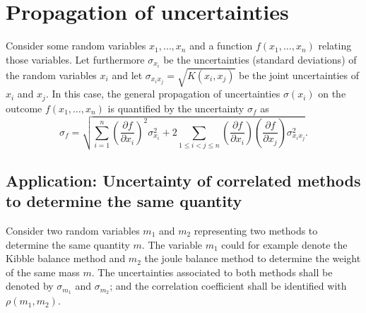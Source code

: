 \documentclass{report}
\numberwithin{tm}{section}
\begin{document}
\section{Propagation of uncertainties}
Consider some random variables $x_1,\dots,x_n$ and a function $f(x_1,\dots,x_n)$ relating those variables. Let furthermore $\sigma_{x_i}$ be the uncertainties (standard deviations) of the random variables $x_i$ and let $\sigma_{x_ix_j} = \sqrt{K(x_i,x_j)}$ be the joint uncertainties of $x_i$ and $x_j$. In this case, the general propagation of uncertainties $\sigma(x_i)$ on the outcome $f(x_1,\dots,x_n)$ is quantified by the uncertainty $\sigma_f$ as \begin{equation}\label{eq:generallawpropagationofuncertainties}
	\sigma_f = \sqrt{\sum_{i=1}^{n}\left(\frac{\partial f}{\partial x_i}\right)^2 \sigma_{x_i}^2+ 2\sum_{1\leq i<j\leq n}\left(\frac{\partial f}{\partial x_i}\right)\left(\frac{\partial f}{\partial x_j}\right)\sigma_{x_ix_j}^2}.
\end{equation}

\subsection{Application: Uncertainty of correlated methods to determine the same quantity}
Consider two random variables $m_1$ and $m_2$ representing two methods to determine the same quantity $m$. The variable $m_1$ could for example denote the Kibble balance method and $m_2$ the joule balance method to determine the weight of the same mass $m$. The uncertainties associated to both methods shall be denoted by $\sigma_{m_1}$ and $\sigma_{m_2}$; and the correlation coefficient shall be identified with $\rho(m_1,m_2)$.
\end{document}
